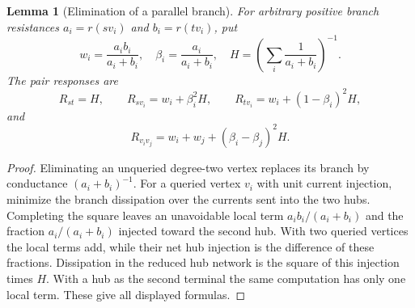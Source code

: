 \documentclass[11pt,letterpaper]{article}
\newtheorem{lemma}[theorem]{Lemma}
\begin{document}
\begin{lemma}[Elimination of a parallel branch]\label{lem:elimination}
For arbitrary positive branch resistances $a_i=r(sv_i)$ and $b_i=r(tv_i)$, put
\[
 w_i=\frac{a_i b_i}{a_i+b_i},\quad
 \beta_i=\frac{a_i}{a_i+b_i},\quad
 H=\left(\sum_i\frac1{a_i+b_i}\right)^{-1}.
\]
The pair responses are
\[
 R_{st}=H,\qquad R_{sv_i}=w_i+\beta_i^2H,\qquad
 R_{tv_i}=w_i+(1-\beta_i)^2H,
\]
and
\[
 R_{v_iv_j}=w_i+w_j+(\beta_i-\beta_j)^2H.
\]
\end{lemma}
\begin{proof}
Eliminating an unqueried degree-two vertex replaces its branch by conductance $(a_i+b_i)^{-1}$. For a queried vertex $v_i$ with unit current injection, minimize the branch dissipation over the currents sent into the two hubs. Completing the square leaves an unavoidable local term $a_i b_i/(a_i+b_i)$ and the fraction $a_i/(a_i+b_i)$ injected toward the second hub. With two queried vertices the local terms add, while their net hub injection is the difference of these fractions. Dissipation in the reduced hub network is the square of this injection times $H$. With a hub as the second terminal the same computation has only one local term. These give all displayed formulas.
\end{proof}
\end{document}
